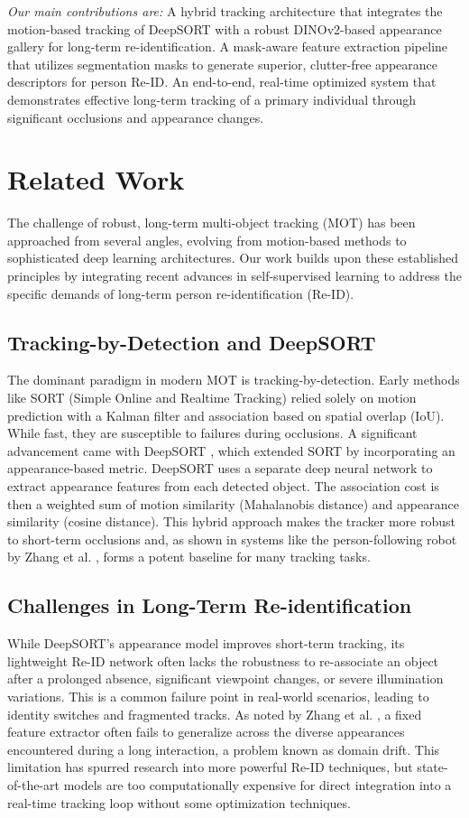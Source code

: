 \documentclass[conference]{IEEEtran}
\begin{document}
\textit{Our main contributions are:}
A hybrid tracking architecture that integrates the motion-based tracking of DeepSORT with a robust DINOv2-based appearance gallery for long-term re-identification.
A mask-aware feature extraction pipeline that utilizes segmentation masks to generate superior, clutter-free appearance descriptors for person Re-ID.
An end-to-end, real-time optimized system that demonstrates effective long-term tracking of a primary individual through significant occlusions and appearance changes.
\section{Related Work}
The challenge of robust, long-term multi-object tracking (MOT) has been approached from several angles, evolving from motion-based methods to sophisticated deep learning architectures. Our work builds upon these established principles by integrating recent advances in self-supervised learning to address the specific demands of long-term person re-identification (Re-ID).
\subsection{Tracking-by-Detection and DeepSORT}
The dominant paradigm in modern MOT is tracking-by-detection. Early methods like SORT (Simple Online and Realtime Tracking) \cite{Bewley2016_sort} relied solely on motion prediction with a Kalman filter and association based on spatial overlap (IoU). While fast, they are susceptible to failures during occlusions.
A significant advancement came with DeepSORT \cite{Wojke2017simple,Wojke2018deep}, which extended SORT by incorporating an appearance-based metric. DeepSORT uses a separate deep neural network to extract appearance features from each detected object. The association cost is then a weighted sum of motion similarity (Mahalanobis distance) and appearance similarity (cosine distance). This hybrid approach makes the tracker more robust to short-term occlusions and, as shown in systems like the person-following robot by Zhang et al. \cite{10623162}, forms a potent baseline for many tracking tasks.
\subsection{Challenges in Long-Term Re-identification}
While DeepSORT's appearance model improves short-term tracking, its lightweight Re-ID network often lacks the robustness to re-associate an object after a prolonged absence, significant viewpoint changes, or severe illumination variations. This is a common failure point in real-world scenarios, leading to identity switches and fragmented tracks. As noted by Zhang et al. \cite{10623162}, a fixed feature extractor often fails to generalize across the diverse appearances encountered during a long interaction, a problem known as domain drift. This limitation has spurred research into more powerful Re-ID techniques, but state-of-the-art models are too computationally expensive for direct integration into a real-time tracking loop without some optimization techniques.
\end{document}
